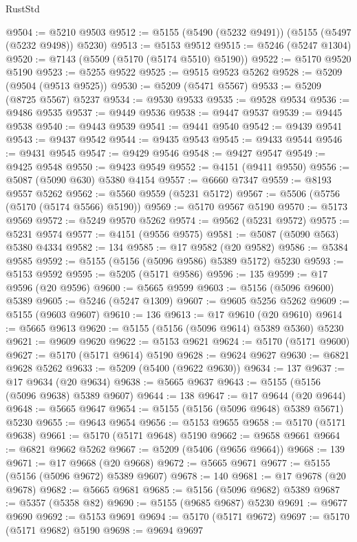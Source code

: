 \begin{lexlean}{RustStd}
\begin{coremodule}
@9504 := @5210 @9503
@9512 := @5155 (@5490 (@5232 @9491)) (@5155 (@5497 (@5232 @9498)) @5230)
@9513 := @5153 @9512
@9515 := @5246 (@5247 @1304)
@9520 := @7143 (@5509 (@5170 (@5174 @5510) @5190))
@9522 := @5170 @9520 @5190
@9523 := @5255 @9522
@9525 := @9515 @9523 @5262
@9528 := @5209 (@9504 (@9513 @9525))
@9530 := @5209 (@5471 @5567)
@9533 := @5209 (@8725 @5567) @5237
@9534 := @9530 @9533
@9535 := @9528 @9534
@9536 := @9486 @9535
@9537 := @9449 @9536
@9538 := @9447 @9537
@9539 := @9445 @9538
@9540 := @9443 @9539
@9541 := @9441 @9540
@9542 := @9439 @9541
@9543 := @9437 @9542
@9544 := @9435 @9543
@9545 := @9433 @9544
@9546 := @9431 @9545
@9547 := @9429 @9546
@9548 := @9427 @9547
@9549 := @9425 @9548
@9550 := @9423 @9549
@9552 := @4151 (@9411 @9550)
@9556 := @5087 (@5090 @630) @5380 @4154
@9557 := @6660 @7347
@9559 := @8193 @9557 @5262
@9562 := @5560 @9559 (@5231 @5172)
@9567 := @5506 (@5756 (@5170 (@5174 @5566) @5190))
@9569 := @5170 @9567 @5190
@9570 := @5173 @9569
@9572 := @5249 @9570 @5262
@9574 := @9562 (@5231 @9572)
@9575 := @5231 @9574
@9577 := @4151 (@9556 @9575)
@9581 := @5087 (@5090 @563) @5380 @4334
@9582 := 134
@9585 := @17 @9582 (@20 @9582)
@9586 := @5384 @9585
@9592 := @5155 (@5156 (@5096 @9586) @5389 @5172) @5230
@9593 := @5153 @9592
@9595 := @5205 (@5171 @9586)
@9596 := 135
@9599 := @17 @9596 (@20 @9596)
@9600 := @5665 @9599
@9603 := @5156 (@5096 @9600) @5389
@9605 := @5246 (@5247 @1309)
@9607 := @9605 @5256 @5262
@9609 := @5155 (@9603 @9607)
@9610 := 136
@9613 := @17 @9610 (@20 @9610)
@9614 := @5665 @9613
@9620 := @5155 (@5156 (@5096 @9614) @5389 @5360) @5230
@9621 := @9609 @9620
@9622 := @5153 @9621
@9624 := @5170 (@5171 @9600)
@9627 := @5170 (@5171 @9614) @5190
@9628 := @9624 @9627
@9630 := @6821 @9628 @5262
@9633 := @5209 (@5400 (@9622 @9630))
@9634 := 137
@9637 := @17 @9634 (@20 @9634)
@9638 := @5665 @9637
@9643 := @5155 (@5156 (@5096 @9638) @5389 @9607)
@9644 := 138
@9647 := @17 @9644 (@20 @9644)
@9648 := @5665 @9647
@9654 := @5155 (@5156 (@5096 @9648) @5389 @5671) @5230
@9655 := @9643 @9654
@9656 := @5153 @9655
@9658 := @5170 (@5171 @9638)
@9661 := @5170 (@5171 @9648) @5190
@9662 := @9658 @9661
@9664 := @6821 @9662 @5262
@9667 := @5209 (@5406 (@9656 @9664))
@9668 := 139
@9671 := @17 @9668 (@20 @9668)
@9672 := @5665 @9671
@9677 := @5155 (@5156 (@5096 @9672) @5389 @9607)
@9678 := 140
@9681 := @17 @9678 (@20 @9678)
@9682 := @5665 @9681
@9685 := @5156 (@5096 @9682) @5389
@9687 := @5357 (@5358 @82)
@9690 := @5155 (@9685 @9687) @5230
@9691 := @9677 @9690
@9692 := @5153 @9691
@9694 := @5170 (@5171 @9672)
@9697 := @5170 (@5171 @9682) @5190
@9698 := @9694 @9697

\end{coremodule}
\end{lexlean}
